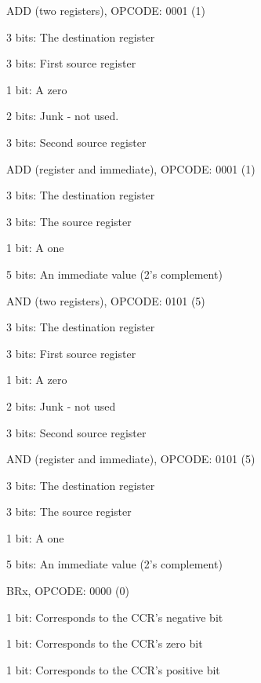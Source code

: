\begin{DoxyItemize}
\item ADD (two registers), OPCODE: 0001 (1) 
\begin{DoxyItemize}
\item 3 bits: The destination register 
\item 3 bits: First source register 
\item 1 bit: A zero 
\item 2 bits: Junk -\/ not used. 
\item 3 bits: Second source register 
\end{DoxyItemize}\item ADD (register and immediate), OPCODE: 0001 (1) 
\begin{DoxyItemize}
\item 3 bits: The destination register 
\item 3 bits: The source register 
\item 1 bit: A one 
\item 5 bits: An immediate value (2's complement) 
\end{DoxyItemize}\item AND (two registers), OPCODE: 0101 (5) 
\begin{DoxyItemize}
\item 3 bits: The destination register 
\item 3 bits: First source register 
\item 1 bit: A zero 
\item 2 bits: Junk -\/ not used 
\item 3 bits: Second source register 
\end{DoxyItemize}\item AND (register and immediate), OPCODE: 0101 (5) 
\begin{DoxyItemize}
\item 3 bits: The destination register 
\item 3 bits: The source register 
\item 1 bit: A one 
\item 5 bits: An immediate value (2's complement) 
\end{DoxyItemize}\item BRx, OPCODE: 0000 (0) 
\begin{DoxyItemize}
\item 1 bit: Corresponds to the CCR's negative bit 
\item 1 bit: Corresponds to the CCR's zero bit 
\item 1 bit: Corresponds to the CCR's positive bit 

\end{DoxyItemize}
\end{DoxyItemize}
